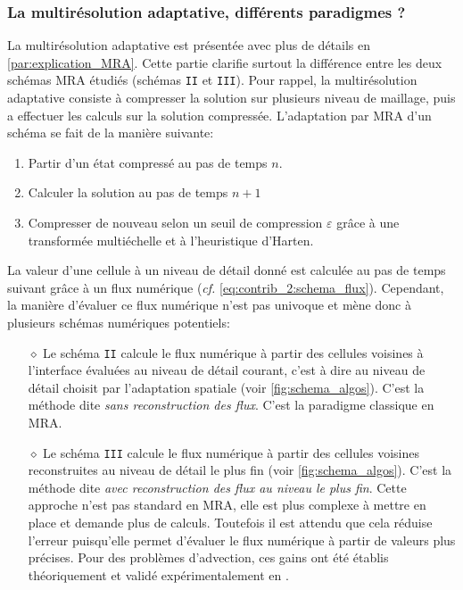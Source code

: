         \subsubsection{La multirésolution adaptative, différents paradigmes ?}\label{par:paradigme_MRA}
            La multirésolution adaptative est présentée avec plus de détails en \ref{par:explication_MRA}.    
            Cette partie clarifie surtout la différence entre les deux schémas MRA étudiés (schémas \texttt{II} et \texttt{III}).
            Pour rappel, la multirésolution adaptative consiste à compresser la solution sur plusieurs niveau de maillage,
            puis a effectuer les calculs sur la solution compressée.
            L'adaptation par MRA d'un schéma se fait de la manière suivante:
            \begin{enumerate}
                \item Partir d'un état compressé au pas de temps $n$.
                \item Calculer la solution au pas de temps $n+1$
                \item Compresser de nouveau selon un seuil de compression $\varepsilon$ grâce à une transformée multiéchelle et à l'heuristique d'Harten.
            \end{enumerate}
            La valeur d'une cellule à un niveau de détail donné est calculée au pas de temps suivant
            grâce à un flux numérique (\emph{cf.} \eqref{eq:contrib_2:schema_flux}). 
            Cependant, la manière d'évaluer ce flux numérique n'est pas univoque et mène donc à plusieurs schémas numériques potentiels:
            \begin{itemize}
                \item[$\diamond$] Le schéma \texttt{II} calcule le flux numérique
                à partir des cellules voisines à l'interface évaluées au niveau de détail courant, c'est à dire au niveau de détail choisit par l'adaptation spatiale (voir \ref{fig:schema_algos}). 
                C'est la méthode dite \textit{sans reconstruction des flux}. C'est la paradigme classique en MRA.
                \item[$\diamond$] Le schéma \texttt{III} calcule le flux numérique 
                à partir des cellules voisines reconstruites au niveau de détail le plus fin (voir \ref{fig:schema_algos}). C'est la méthode dite \textit{avec reconstruction des flux au niveau le plus fin}.
                Cette approche n'est pas standard en MRA, elle est plus complexe à mettre en place et demande plus de calculs.
                Toutefois il est attendu que cela réduise l'erreur puisqu'elle permet d'évaluer le flux numérique à partir de valeurs plus précises.
                Pour des problèmes d'advection, ces gains ont été établis théoriquement et validé expérimentalement en \cite{belloti_et_al_2025}.
            \end{itemize}

